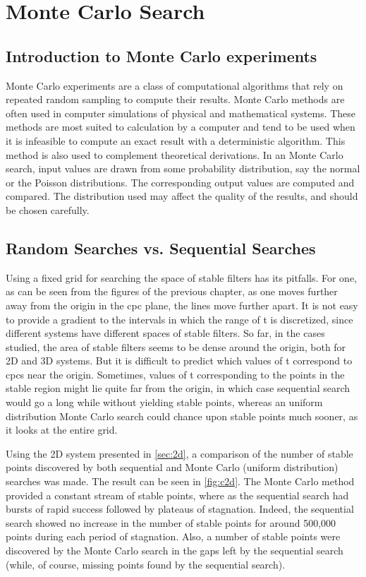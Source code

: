 \chapter{Monte Carlo Search}
\label{chap:monte}
\section{Introduction to Monte Carlo experiments}
Monte Carlo experiments are a class of 
computational algorithms that rely on repeated random sampling to compute 
their results. Monte Carlo methods are often used in computer simulations 
of physical and mathematical systems. These methods are most suited to 
calculation by a computer and tend to be used when it is infeasible to 
compute an exact result with a deterministic algorithm. This method is 
also used to complement theoretical derivations. 
In an Monte Carlo search, input values are drawn from some probability 
distribution, say the normal or the Poisson distributions. The 
corresponding output values are computed and compared. The distribution 
used may affect the quality of the results, and should be chosen 
carefully. 

\section{Random Searches vs. Sequential Searches}
Using a fixed grid for searching the space of stable filters has its 
pitfalls. For one, as can be seen from the figures of the previous 
chapter, as one moves further away from the origin in the \gls{cpc} plane, 
the lines move further apart. It is not easy to provide a gradient to the 
intervals in which the range of \gls{t} is discretized, since different 
systems have different spaces of stable filters. So far, in the cases 
studied, the area of stable filters seems to be dense around the origin, 
both for 2D and 3D systems. But it is difficult to predict which values of 
\gls{t} correspond to \glspl{cpc} near the origin. Sometimes, values of 
\gls{t} corresponding to the points in the stable region might lie quite 
far from the origin, in which case sequential search would go a long while 
without yielding stable points, whereas an uniform distribution Monte 
Carlo search could chance upon stable points much sooner, as it looks at 
the entire grid.

Using the 2D system presented in \autoref{sec:2d}, a comparison of the number 
of stable points discovered by both sequential and Monte Carlo (uniform 
distribution) searches was made. The result can be seen in \autoref{fig:c2d}. 
The Monte Carlo method provided a constant stream of stable points, where 
as the sequential search had bursts of rapid success followed by plateaus 
of stagnation. Indeed, the sequential search showed no increase in the 
number of stable points for around 500,000 points during each period of 
stagnation. Also, a number of stable points were discovered by the Monte 
Carlo search in the gaps left by the sequential search (while, of course, 
missing points found by the sequential search).

